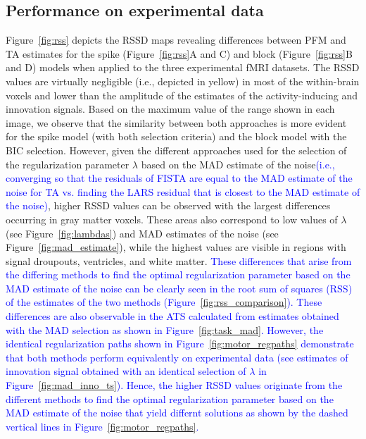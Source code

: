
\subsection{Performance on experimental data}

Figure~\ref{fig:rss} depicts the RSSD maps revealing differences between PFM and
TA estimates for the spike (Figure~\ref{fig:rss}A and C) and block
(Figure~\ref{fig:rss}B and D) models when applied to the three experimental fMRI
datasets. The RSSD values are virtually negligible (i.e., depicted in yellow) in
most of the within-brain voxels and lower than the amplitude of the estimates of
the activity-inducing and innovation signals. Based on the maximum value of the
range shown in each image, we observe that the similarity between both
approaches is more evident for the spike model (with both selection criteria)
and the block model with the BIC selection. However, given the different
approaches used for the selection of the regularization parameter $\lambda$
based on the MAD estimate of the noise\textcolor{blue}{(i.e., converging so that
the residuals of FISTA are equal to the MAD estimate of the noise for TA vs.
finding the LARS residual that is closest to the MAD estimate of the noise)},
higher RSSD values can be observed with the largest differences occurring in
gray matter voxels. These areas also correspond to low values of $\lambda$ (see
Figure~\ref{fig:lambdas}) and MAD estimates of the noise (see
Figure~\ref{fig:mad_estimate}), while the highest values are visible in regions
with signal droupouts, ventricles, and white matter. \textcolor{blue}{These
differences that arise from the differing methods to find the optimal
regularization parameter based on the MAD estimate of the noise can be clearly
seen in the root sum of squares (RSS) of the estimates of the two methods
(Figure~\ref{fig:rss_comparison}). These differences are also observable in the
ATS calculated from estimates obtained with the MAD selection as shown in
Figure~\ref{fig:task_mad}. However, the identical regularization paths shown in
Figure~\ref{fig:motor_regpaths} demonstrate that both methods perform
equivalently on experimental data (see estimates of innovation signal obtained
with an identical selection of $\lambda$ in Figure~\ref{fig:mad_inno_ts}).
Hence, the higher RSSD values originate from the different methods to find the
optimal regularization parameter based on the MAD estimate of the noise that
yield differnt solutions as shown by the dashed vertical lines in
Figure~\ref{fig:motor_regpaths}.}

